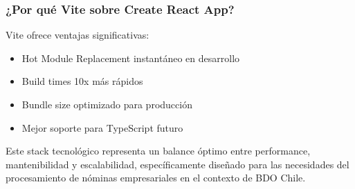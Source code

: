 \subsubsection{¿Por qué Vite sobre Create React App?}
Vite ofrece ventajas significativas:
\begin{itemize}
    \item Hot Module Replacement instantáneo en desarrollo
    \item Build times 10x más rápidos
    \item Bundle size optimizado para producción
    \item Mejor soporte para TypeScript futuro
\end{itemize}

Este stack tecnológico representa un balance óptimo entre performance, mantenibilidad y escalabilidad, específicamente diseñado para las necesidades del procesamiento de nóminas empresariales en el contexto de BDO Chile.
